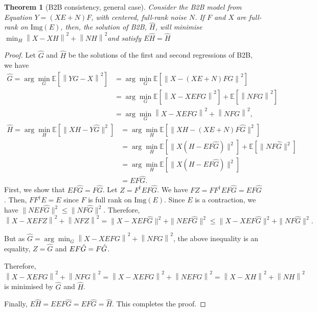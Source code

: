 \documentclass{article}
\newtheorem{theorem}{Theorem}
\begin{document}
\setcounter{theorem}{1}
 \begin{theorem}[B2B consistency, general case]

     Consider the B2B model from Equation $Y = (XE + N)F$, with centered, full-rank noise $N$.
     If $F$ and $X$ are full-rank on $\text{Img}(E)$, then, the solution of B2B, $\hat H$, will minimise
     $\min_H  \left \| X - XH\right\| ^2  + \left \| NH\right \| ^2$and satisfy $E\hat H = \hat H$
\end{theorem}
\begin{proof}

 Let $\hat G$ and $\hat H$ be the solutions of the first and second regressions of B2B, we have
 \begin{align*}
    \hat G = \arg \min_G \mathbb{E}[\left \| YG - X \right \|^2] &=   \arg \min_G \mathbb{E}[\left \| X - (XE + N)FG \right\|^2]\\
                                                        &{}= \arg \min_G \mathbb{E}[\left \| X - XEFG\right\| ^2]  + \mathbb{E}[\left \| NFG\right \| ^2]\\
                                                        &{}= \arg \min_G \left \| X - XEFG\right\| ^2  + \left \| NFG\right \| ^2,
     \label{eq:doublenorm}
\end{align*}
\begin{align*}
    \hat H = \arg \min_H \mathbb{E}[\| XH - Y \hat{G} \|^2] &=\arg  \min_H \mathbb{E}[\| XH - (XE + N)F \hat G \|^2] \\
    &=\arg \min_H \mathbb{E}[\| X(H - EF \hat G) \| ^2] + \mathbb{E}[\| NF\hat G \| ^2]\\
    &= \arg \min_H \mathbb{E}[\| X(H - EF \hat G) \| ^2]\\
    &= EF \hat G.
\end{align*}
%
First, we show that $EF\hat G = F\hat G$.
%
Let $Z=F^\dagger EF\hat G$. We have $FZ = FF^\dagger EF  \hat G= EF\hat G$.
Then, $FF^\dagger E =E$ since $F$ is full rank on $\text{Img}(E)$.
%
Since $E$ is a contraction, we have $ \| NEF\hat G\|^2 \leq \| NF\hat G \|^2$. Therefore, 
 $$\left \| X - XEFZ\right \| ^2  + \left \| NFZ\right \| ^2 = \| X - XEF\hat G \| ^2  + \| NEF\hat G \| ^2 \leq \| X - XEF\hat G \| ^2  + \| NF\hat G \| ^2.$$

But as $\hat G =  \arg \min_G \left \| X - XEFG\right\| ^2  + \left \| NFG\right \| ^2$, the above inequality is an equality, $Z=\hat G$ and $EF\hat G = F\Hat G$.

Therefore, $\left \| X - XEFG\right \| ^2  + \left \| NFG\right \| ^2 = \left \| X - XEFG\right \| ^2  + \left \| NEFG\right \| ^2 = \left \| X - XH\right \| ^2  + \left \| NH\right \| ^2$ is minimised by $\hat G$ and $\hat H$. 

Finally, $E\hat H = E EF\hat G = EF\hat G = \hat H$. This completes the proof.
\end{proof}
\end{document}
